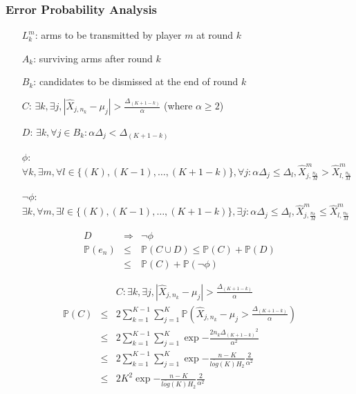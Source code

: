 \documentclass{sig-alternate}
\newcommand{\pr}[1]{\ensuremath{\mathbb{P}{(#1)}}}
\newcommand{\meant}[2]{\ensuremath{\hat{X}_{#1,#2}}}
\newcommand{\meanp}[3]{\ensuremath{\hat{X}_{#1,#2}^{#3}}}
\newcommand{\mean}[1]{\ensuremath{\mu_{#1}}}
\newcommand{\delmean}[1]{\ensuremath{\Delta_{#1}}}
\begin{document}
\subsubsection{Error Probability Analysis}

\begin{itemize}
\item[$L_k^m$:] arms to be transmitted by player $m$ at round $k$
\item[$A_k$:] surviving arms after round $k$
\item[$B_k$:] candidates to be dismissed at the end of round $k$
\end{itemize}

\begin{itemize}
\item[$C$:] $\exists k, \exists j, |\meant{j}{n_k} - \mean{j}| > \frac{\delmean{(K+1-k)}}{\alpha}$ (where $\alpha \geq 2$) 
\item[$D$:] $\exists k, \forall j\in B_k: \alpha\delmean{j} < \delmean{(K+1-k)}$
\item[$\phi$:]$\forall k, \exists m, \forall l\in \{(K), (K-1),\ldots,(K+1-k)\}, \forall j:\alpha\delmean{j}\leq\delmean{l},  \meanp{j}{\frac{n_k}{M}}{m} > \meanp{l}{\frac{n_k}{M}}{m} $
\item[$\neg\phi$:]$\exists k,\forall m, \exists l\in \{(K), (K-1),\ldots,(K+1-k)\}, \exists j:\alpha\delmean{j}\leq\delmean{l},  \meanp{j}{\frac{n_k}{M}}{m}  \leq \meanp{l}{\frac{n_k}{M}}{m}$
\end{itemize}

\begin{eqnarray*}
D &\Rightarrow&  \neg\phi\\
\pr{e_n} &\leq& \pr{C \cup D} \leq \pr{C} + \pr{D}\\
&\leq& \pr{C} + \pr{\neg\phi}
\end{eqnarray*}

\begin{eqnarray*}
&& C: \exists k, \exists j, |\meant{j}{n_k} - \mean{j}| > \frac{\delmean{(K+1-k)}}{\alpha} \\
\pr{C} &\leq&  2\sum_{k=1}^{K-1}\sum_{j=1}^{K} \pr{\meant{j}{n_k}-\mean{j}>\frac{\delmean{(K+1-k)}}{\alpha}}\\
&\leq& 2\sum_{k=1}^{K-1}\sum_{j=1}^{K} \exp{-\frac{2n_k\delmean{(K+1-k)}^2}{\alpha^2}}\\
&\leq& 2\sum_{k=1}^{K-1}\sum_{j=1}^{K} \exp{-\frac{n-K}{\overline{log}(K)H_2}\frac{2}{\alpha^2}}\\
&\leq& 2K^2 \exp{-\frac{n-K}{\overline{log}(K)H_2}\frac{2}{\alpha^2}}\\
\end{eqnarray*}
\end{document}
